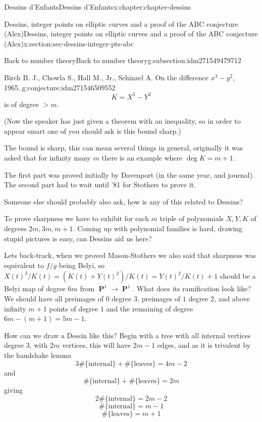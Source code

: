 \documentclass[oneside,10pt,]{book}
\numberwithin{equation}{section}
\DeclareMathOperator{\PP}{\mathbf{P}}
\newcommand{\gt}{>}
\begin{document}
\begin{chapterptx}{Dessins d'Enfants}{}{Dessins d'Enfants}{}{}{x:chapter:chapter-dessins}
\begin{sectionptx}{Dessins, integer points on elliptic curves and a proof of the ABC conjecture (Alex)}{}{Dessins, integer points on elliptic curves and a proof of the ABC conjecture (Alex)}{}{}{x:section:sec-dessins-integer-pts-abc}
\begin{subsectionptx}{Back to number theory}{}{Back to number theory}{}{}{g:subsection:idm271549479712}
\begin{conjecture}{Birch B. J., Chowla S., Hall M., Jr., Schinzel A. On the difference \(x^3 - y^2\), 1965..}{}{g:conjecture:idm271546509552}
\begin{equation*}
K = X^3 - Y^2
\end{equation*}
is of degree \(\gt m\).%
\par
(Now the speaker has just given a theorem with an inequality, so in order to appear smart one of you should ask is this bound sharp.)%
\par
The bound is sharp, this can mean several things in general, originally it was asked that for infinity many \(m\) there is an example where \(\deg K = m + 1\).%
\end{conjecture}
The first part was proved initially by Davenport (in the same year, and journal). The second part had to wait until '81 for Stothers to prove it.%
\par
Someone else should probably also ask, how is any of this related to Dessins?%
\par
To prove sharpness we have to exhibit for each \(m\) triple of polynomials \(X,Y,K\) of degrees \(2m,3m,m+1\). Coming up with polynomial families is hard, drawing stupid pictures is easy, can Dessins aid us here?%
\par
Lets back-track, when we proved Mason-Stothers we also said that sharpness was equivalent to \(f/g\) being Belyi, so \(X(t)^3/K(t) = (K(t) + Y(t)^2) / K(t) = Y(t)^2/K(t) + 1\) should be a Belyi map of degree \(6m\) from \(\PP^1\to \PP^1\). What does its ramification look like? We should have all preimages of \(0\) degree 3, preimages of \(1\) degree 2, and above infinity \(m + 1\) points of degree \(1\) and the remaining of degree \(6m - (m + 1) = 5m - 1\).%
\par
How can we draw a Dessin like this? Begin with a tree with all internal vertices degree 3, with \(2m\) vertices, this will have \(2m - 1\) edges, and as it is trivalent by the handshake lemma%
\begin{equation*}
3 \#\{\text{internal}\} + \#\{\text{leaves}\} =  4m - 2
\end{equation*}
and%
\begin{equation*}
\#\{\text{internal}\} + \#\{\text{leaves}\} =  2m
\end{equation*}
giving%
\begin{equation*}
2\#\{\text{internal}\} =  2m - 2
\end{equation*}
%
\begin{equation*}
\#\{\text{internal}\} =  m - 1
\end{equation*}
%
\begin{equation*}
\#\{\text{leaves}\} =  m + 1

\end{equation*}
\end{subsectionptx}
\end{sectionptx}
\end{chapterptx}
\end{document}
